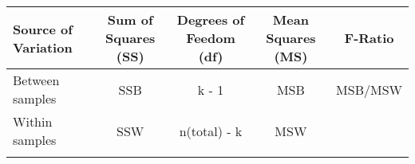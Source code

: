 \documentclass[]{book}
\theoremstyle{definition}
\theoremstyle{definition}
\theoremstyle{definition}
\theoremstyle{remark}
\begin{document}
\begin{longtable}[]{@{}lcccc@{}}
\toprule
\begin{minipage}[b]{0.19\columnwidth}\raggedright
Source of Variation\strut
\end{minipage} & \begin{minipage}[b]{0.19\columnwidth}\centering
Sum of Squares (SS)\strut
\end{minipage} & \begin{minipage}[b]{0.22\columnwidth}\centering
Degrees of Feedom (df)\strut
\end{minipage} & \begin{minipage}[b]{0.17\columnwidth}\centering
Mean Squares (MS)\strut
\end{minipage} & \begin{minipage}[b]{0.08\columnwidth}\centering
F-Ratio\strut
\end{minipage}\tabularnewline
\midrule
\endhead
\begin{minipage}[t]{0.19\columnwidth}\raggedright
Between samples\strut
\end{minipage} & \begin{minipage}[t]{0.19\columnwidth}\centering
SSB\strut
\end{minipage} & \begin{minipage}[t]{0.22\columnwidth}\centering
k - 1\strut
\end{minipage} & \begin{minipage}[t]{0.17\columnwidth}\centering
MSB\strut
\end{minipage} & \begin{minipage}[t]{0.08\columnwidth}\centering
MSB/MSW\strut
\end{minipage}\tabularnewline
\begin{minipage}[t]{0.19\columnwidth}\raggedright
Within samples\strut
\end{minipage} & \begin{minipage}[t]{0.19\columnwidth}\centering
SSW\strut
\end{minipage} & \begin{minipage}[t]{0.22\columnwidth}\centering
n(total) - k\strut
\end{minipage} & \begin{minipage}[t]{0.17\columnwidth}\centering
MSW\strut
\end{minipage} & \begin{minipage}[t]{0.08\columnwidth}\centering
\strut
\end{minipage}\tabularnewline
\begin{minipage}[t]{0.19\columnwidth}\raggedright

\end{minipage}
\end{longtable}
\end{document}
